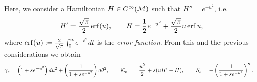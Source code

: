 \documentclass[notas.tex]{subfiles} 				%
\begin{document}

Here, we consider a Hamiltonian $H \in C^\infty(\mathcal{M})$ such that $H'' = e^{-u^2}$, i.e.
\begin{align*}
	H' = \frac{\sqrt{\pi}}{2}\operatorname{erf}(u), \qquad	H = \frac{1}{2}e^{- u^2} + \frac{\sqrt{\pi}}{2}u\operatorname{erf}{u},
\end{align*}
where $\operatorname{erf}(u) := \frac{2}{\sqrt{\pi}}\int_0^u e^{-t^2} dt$ is the \emph{error function}. From this and the previous considerations we obtain
\begin{align}
	\gamma_s &= \left( 1 + se^{-u^2} \right) du^2 + \left( \frac{1}{1+se^{-u^2}} \right) d\theta^2, \qquad
	\mathcal{K}_s &= \frac{u^2}{2} + s (u H' - H), \qquad
	S_s &= - \left( \frac{1}{1+se^{-u^2}} \right)''. \label{eq_cyl_curvature}
\end{align}

\end{document}

